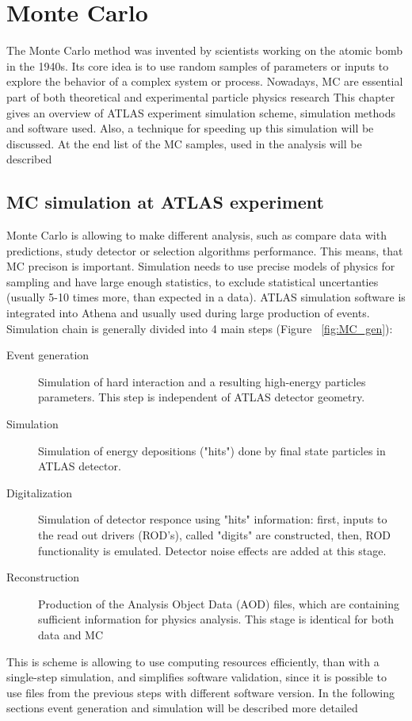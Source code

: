 
\chapter{Monte Carlo}
The Monte Carlo method was invented by scientists working on the atomic bomb in the 1940s. Its core idea is to use random samples of parameters or inputs to explore the behavior of a complex system or process.  Nowadays, MC are essential part of both theoretical and experimental particle physics research
This chapter gives an overview of ATLAS experiment simulation scheme, simulation methods and software used. Also, a technique for speeding up this simulation will be discussed. At the end list of the MC samples, used in the analysis will be described

\section{MC simulation at ATLAS experiment}

\begin{figure}[h]
\end{figure}

Monte Carlo is allowing to make different analysis, such as compare data with predictions, study detector or selection algorithms performance. This means, that MC precison is important. Simulation needs to use precise models of physics for sampling and have large enough statistics, to exclude statistical uncertanties (usually 5-10 times more, than expected in a data). ATLAS simulation software is integrated into Athena and usually used during large production of events. Simulation chain is generally divided into 4 main steps (Figure ~\ref{fig:MC_gen}):
\begin{description}
\item[Event generation]Simulation of hard interaction and a resulting high-energy particles parameters. This step is independent of ATLAS detector geometry.
\item[Simulation]Simulation of energy depositions ("hits") done by final state particles in ATLAS detector.
\item[Digitalization] Simulation of detector responce using "hits" information:  first, inputs to the read out drivers (ROD's), called "digits" are constructed, then, ROD functionality is emulated. Detector noise effects are added at this stage. 
\item[Reconstruction] Production of the Analysis Object Data (AOD) files, which are containing sufficient information for physics analysis. This stage is identical for both data and MC
\end{description}
This is scheme is allowing to use computing resources efficiently, than with a single-step simulation, and simplifies software validation, since it is possible to use files from the previous steps with different software version. In the following sections event generation and simulation will be described more detailed

